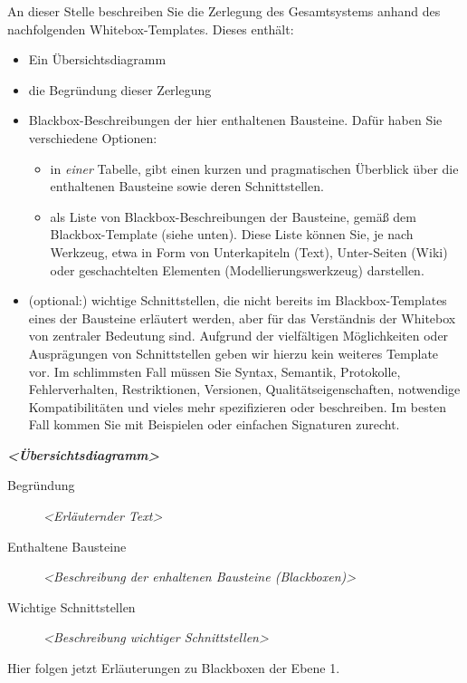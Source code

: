 \documentclass[]{article}
\begin{document}
An dieser Stelle beschreiben Sie die Zerlegung des Gesamtsystems anhand
des nachfolgenden Whitebox-Templates. Dieses enthält:

\begin{itemize}
\item
  Ein Übersichtsdiagramm
\item
  die Begründung dieser Zerlegung
\item
  Blackbox-Beschreibungen der hier enthaltenen Bausteine. Dafür haben
  Sie verschiedene Optionen:

  \begin{itemize}
  \item
    in \emph{einer} Tabelle, gibt einen kurzen und pragmatischen
    Überblick über die enthaltenen Bausteine sowie deren Schnittstellen.
  \item
    als Liste von Blackbox-Beschreibungen der Bausteine, gemäß dem
    Blackbox-Template (siehe unten). Diese Liste können Sie, je nach
    Werkzeug, etwa in Form von Unterkapiteln (Text), Unter-Seiten (Wiki)
    oder geschachtelten Elementen (Modellierungswerkzeug) darstellen.
  \end{itemize}
\item
  (optional:) wichtige Schnittstellen, die nicht bereits im
  Blackbox-Templates eines der Bausteine erläutert werden, aber für das
  Verständnis der Whitebox von zentraler Bedeutung sind. Aufgrund der
  vielfältigen Möglichkeiten oder Ausprägungen von Schnittstellen geben
  wir hierzu kein weiteres Template vor. Im schlimmsten Fall müssen Sie
  Syntax, Semantik, Protokolle, Fehlerverhalten, Restriktionen,
  Versionen, Qualitätseigenschaften, notwendige Kompatibilitäten und
  vieles mehr spezifizieren oder beschreiben. Im besten Fall kommen Sie
  mit Beispielen oder einfachen Signaturen zurecht.
\end{itemize}

\emph{\textbf{\textless{}Übersichtsdiagramm\textgreater{}}}

\begin{description}
\item[Begründung]
\emph{\textless{}Erläuternder Text\textgreater{}}
\item[Enthaltene Bausteine]
\emph{\textless{}Beschreibung der enhaltenen Bausteine
(Blackboxen)\textgreater{}}
\item[Wichtige Schnittstellen]
\emph{\textless{}Beschreibung wichtiger Schnittstellen\textgreater{}}
\end{description}

Hier folgen jetzt Erläuterungen zu Blackboxen der Ebene 1.
\end{document}
